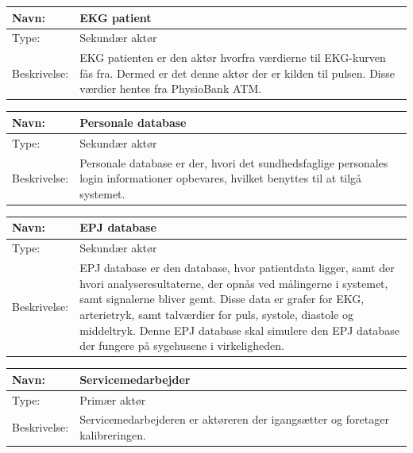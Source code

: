 \begin{table}[h!]
\begin{tabular}{| >{\raggedright\arraybackslash}p{3cm} | >{\raggedright\arraybackslash}p{12cm} |}
   \hline
   Navn: & EKG patient\\ \hline
   Type: & Sekundær aktør \\ \hline
   Beskrivelse: & EKG patienten er den aktør hvorfra værdierne til EKG-kurven fås fra. Dermed er det denne aktør der er kilden til pulsen. Disse værdier hentes fra PhysioBank ATM.\\ \hline
\end{tabular}
\end{table}
\begin{table}[h!]
\begin{tabular}{| >{\raggedright\arraybackslash}p{3cm} | >{\raggedright\arraybackslash}p{12cm} |}
   \hline
   Navn: & Personale database\\ \hline
   Type: & Sekundær aktør \\ \hline
   Beskrivelse: & Personale database er der, hvori det sundhedsfaglige personales login informationer opbevares, hvilket benyttes til at tilgå systemet. \\ \hline
\end{tabular}
\end{table}
\begin{table}[h!]
\begin{tabular}{| >{\raggedright\arraybackslash}p{3cm} | >{\raggedright\arraybackslash}p{12cm} |}
   \hline
   Navn: & EPJ database\\ \hline
   Type: & Sekundær aktør \\ \hline
   Beskrivelse: & EPJ database er den database, hvor patientdata ligger, samt der hvori analyseresultaterne, der opnås ved målingerne i systemet, samt signalerne bliver gemt. Disse data er grafer for EKG, arterietryk, samt talværdier for puls, systole, diastole og middeltryk. Denne EPJ database skal simulere den EPJ database der fungere på sygehusene i virkeligheden.\\ \hline
\end{tabular}
\end{table}
\begin{table}[h!]
\begin{tabular}{| >{\raggedright\arraybackslash}p{3cm} | >{\raggedright\arraybackslash}p{12cm} |}
   \hline
   Navn: & Servicemedarbejder\\ \hline
   Type: & Primær aktør \\ \hline
   Beskrivelse: & Servicemedarbejderen er aktøreren der igangsætter og foretager kalibreringen.\\ \hline
\end{tabular}
\end{table}
\newpage
